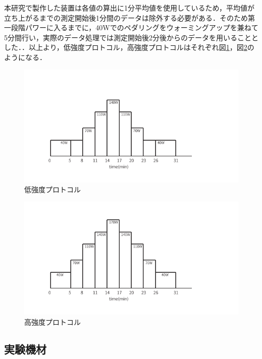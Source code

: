本研究で製作した装置は各値の算出に1分平均値を使用しているため，平均値が立ち上がるまでの測定開始後1分間のデータは除外する必要がある．そのため第一段階パワーに入るまでに，40Wでのペダリングをウォーミングアップを兼ねて5分間行い，実際のデータ処理では測定開始後2分後からのデータを用いることとした．．以上より，低強度プロトコル，高強度プロトコルはそれぞれ図\ref{fig:protocol_rampup_light}，図\ref{fig:protocol_rampup_hard}のようになる．

\begin{figure}[H]
  \begin{center}
    \label{fig:protocol_rampup_light}
    \caption{低強度プロトコル}
    \includegraphics[width=12cm]{fig/protocol_rampup_light.pdf}
  \end{center}
\end{figure}

\begin{figure}[H]
  \begin{center}
    \label{fig:protocol_rampup_hard}
    \caption{高強度プロトコル}
    \includegraphics[width=12cm]{fig/protocol_rampup_hard.pdf}
  \end{center}
\end{figure}

\subsection{実験機材}

